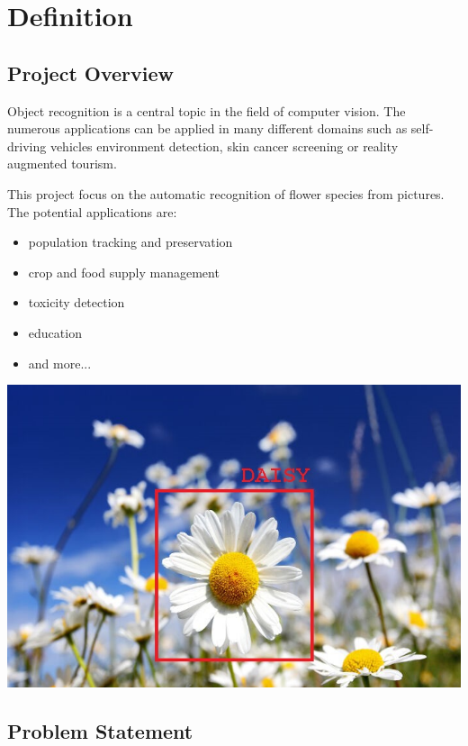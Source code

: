 \section{Definition}

\subsection{Project Overview}

Object recognition is a central topic in the field of computer vision. The numerous applications can be applied in many different domains such as self-driving vehicles environment detection, skin cancer screening or reality augmented tourism.


This project focus on the automatic recognition of flower species from pictures. The potential applications are:

\begin{itemize}
	\setlength\itemsep{1pt}
	\setlength{\parskip}{0pt}
	\setlength{\parsep}{0pt}
	\item population tracking and preservation
	\item crop and food supply management 
	\item toxicity detection 
	\item education
	\item and more...
\end{itemize}

\begin{center}
\includegraphics[scale=1.3]{Daisy_detection.jpg}
\end{center}


\subsection{Problem Statement}

